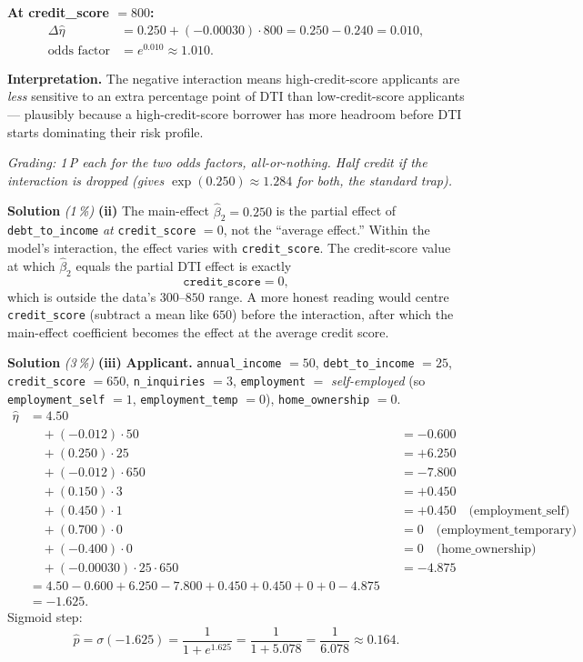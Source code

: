\documentclass[11pt,a4paper]{article}
\newcommand{\subpoints}[1]{\textit{(#1\,\%)}}
\newcommand{\sol}{\noindent\textbf{Solution}}
\begin{document}
\textbf{At credit\_score $= 800$:}
\begin{align*}
\Delta\hat\eta &= 0.250 + (-0.00030)\cdot 800 = 0.250 - 0.240 = 0.010, \\
\text{odds factor} &= e^{0.010} \approx \boxed{1.010}.
\end{align*}

\textbf{Interpretation.} The negative interaction means high-credit-score applicants are
\emph{less} sensitive to an extra percentage point of DTI than low-credit-score applicants ---
plausibly because a high-credit-score borrower has more headroom before DTI starts dominating their
risk profile.

\noindent\emph{Grading: 1\,P each for the two odds factors, all-or-nothing. Half credit if the
interaction is dropped (gives $\exp(0.250) \approx 1.284$ for both, the standard trap).}

\medskip
\sol{} \subpoints{1} \textbf{(ii)} The main-effect $\hat\beta_2 = 0.250$ is the partial effect of
\texttt{debt\_to\_income} \emph{at} \texttt{credit\_score} $= 0$, not the ``average effect.'' Within
the model's interaction, the effect varies with \texttt{credit\_score}. The credit-score value at
which $\hat\beta_2$ equals the partial DTI effect is exactly
$$\texttt{credit\_score} = 0,$$
which is outside the data's $300$--$850$ range. A more honest reading would centre
\texttt{credit\_score} (subtract a mean like $650$) before the interaction, after which the
main-effect coefficient becomes the effect at the average credit score.

\medskip
\sol{} \subpoints{3} \textbf{(iii)} \textbf{Applicant.} \texttt{annual\_income} $= 50$,
\texttt{debt\_to\_income} $= 25$, \texttt{credit\_score} $= 650$, \texttt{n\_inquiries} $= 3$,
\texttt{employment} $=$ \emph{self-employed} (so \texttt{employment\_self} $=1$,
\texttt{employment\_temp} $=0$), \texttt{home\_ownership} $= 0$.
\begin{align*}
\hat\eta &= 4.50 \\
         &\quad + (-0.012)\cdot 50      &&= -0.600 \\
         &\quad + (0.250)\cdot 25       &&= +6.250 \\
         &\quad + (-0.012)\cdot 650     &&= -7.800 \\
         &\quad + (0.150)\cdot 3        &&= +0.450 \\
         &\quad + (0.450)\cdot 1        &&= +0.450 \quad\text{(employment\_self)} \\
         &\quad + (0.700)\cdot 0        &&= 0      \quad\text{(employment\_temporary)} \\
         &\quad + (-0.400)\cdot 0       &&= 0      \quad\text{(home\_ownership)} \\
         &\quad + (-0.00030)\cdot 25\cdot 650 &&= -4.875 \\
         &= 4.50 - 0.600 + 6.250 - 7.800 + 0.450 + 0.450 + 0 + 0 - 4.875 \\
         &= \boxed{-1.625}.
\end{align*}
Sigmoid step:
$$\hat p = \sigma(-1.625) = \frac{1}{1 + e^{1.625}} = \frac{1}{1 + 5.078} = \frac{1}{6.078}
   \approx \boxed{0.164}.$$
\end{document}
